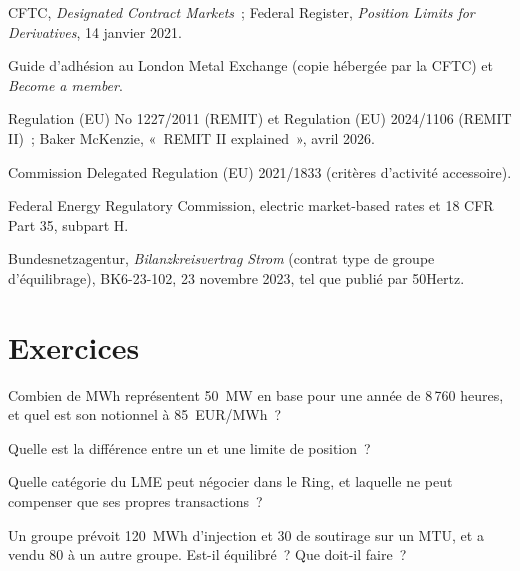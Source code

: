 \begin{omsources}
\item CFTC, \emph{Designated Contract Markets}~; Federal Register, \emph{Position Limits for Derivatives}, 14
janvier 2021.
\item Guide d'adhésion au London Metal Exchange (copie hébergée par la CFTC) et \emph{Become a member}.
\item Regulation (EU) No 1227/2011 (REMIT) et Regulation (EU) 2024/1106 (REMIT II)~; Baker McKenzie, «~REMIT II
explained~», avril 2026.
\item Commission Delegated Regulation (EU) 2021/1833 (critères d'activité accessoire).
\item Federal Energy Regulatory Commission, electric market-based rates et 18 CFR Part 35, subpart H.
\item Bundesnetzagentur, \emph{Bilanzkreisvertrag Strom} (contrat type de groupe d'équilibrage), BK6-23-102, 23 novembre 2023, tel que publié par 50Hertz.
\end{omsources}

\section{Exercices}

\begin{exercise}[$\star$]\label{exo:m3:getting-access-commodities-and-power:1}
Combien de MWh représentent 50~MW en base pour une année de 8\,760 heures, et quel est son notionnel à \qty{85}{EUR/MWh}~?
\end{exercise}

\begin{exercise}[$\star$]\label{exo:m3:getting-access-commodities-and-power:2}
Quelle est la différence entre un  et une limite de position~?
\end{exercise}

\begin{exercise}[$\star$]\label{exo:m3:getting-access-commodities-and-power:3}
Quelle catégorie du LME peut négocier dans le Ring, et laquelle ne peut compenser que ses propres transactions~?
\end{exercise}

\begin{exercise}[$\star\star$]\label{exo:m3:getting-access-commodities-and-power:4}
Un groupe prévoit 120~MWh d'injection et 30 de soutirage sur un MTU, et a vendu 80 à un autre groupe. Est-il
équilibré~? Que doit-il faire~?
\end{exercise}

